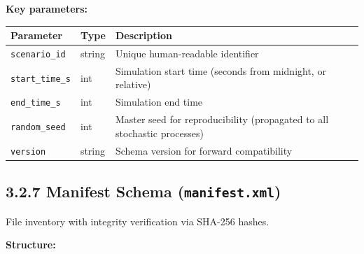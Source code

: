 \textbf{Key parameters:}

\begin{longtable}[]{@{}lll@{}}
\toprule\noalign{}
Parameter & Type & Description \\
\midrule\noalign{}
\endhead
\bottomrule\noalign{}
\endlastfoot
\texttt{scenario\_id} & string & Unique human-readable identifier \\
\texttt{start\_time\_s} & int & Simulation start time (seconds from
midnight, or relative) \\
\texttt{end\_time\_s} & int & Simulation end time \\
\texttt{random\_seed} & int & Master seed for reproducibility
(propagated to all stochastic processes) \\
\texttt{version} & string & Schema version for forward compatibility \\
\end{longtable}

\subsection{\texorpdfstring{3.2.7 Manifest Schema
(\texttt{manifest.xml})}{3.2.7 Manifest Schema (manifest.xml)}}\label{327-manifest-schema-manifestxml}

File inventory with integrity verification via SHA-256 hashes.

\textbf{Structure:}

\begin{Shaded}
\begin{Highlighting}[]
\NormalTok{\textless{}}\NormalTok{\textgreater{}}
\NormalTok{  \textless{}}\NormalTok{/\textgreater{}}
\NormalTok{  \textless{}}\NormalTok{\textgreater{}}
\NormalTok{    \textless{}}\NormalTok{/\textgreater{}}
\NormalTok{    \textless{}}\NormalTok{/\textgreater{}}
\NormalTok{    \textless{}}\NormalTok{/\textgreater{}}
\NormalTok{    \textless{}}\NormalTok{/\textgreater{}}
\NormalTok{  \textless{}/}\NormalTok{\textgreater{}}
\NormalTok{  \textless{}}\NormalTok{/\textgreater{}}
\NormalTok{\textless{}/}\NormalTok{\textgreater{}}
\end{Highlighting}
\end{Shaded}

